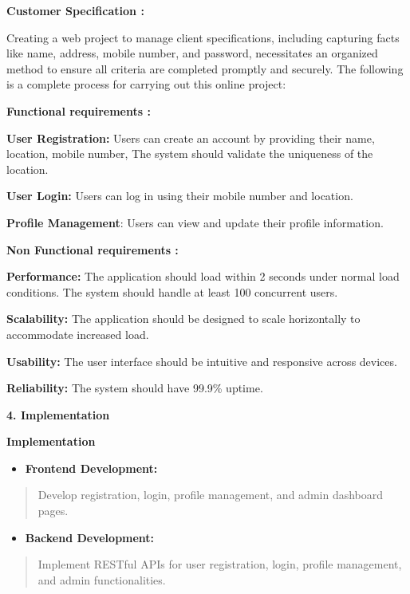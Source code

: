 \documentclass[
]{article}
\begin{document}
\textbf{Customer Specification :}

Creating a web project to manage client specifications, including
capturing facts like name, address, mobile number, and password,
necessitates an organized method to ensure all criteria are completed
promptly and securely. The following is a complete process for carrying
out this online project:

\textbf{Functional requirements :}

\textbf{User Registration:} Users can create an account by providing
their name, location, mobile number, The system should validate the
uniqueness of the location.

\textbf{User Login:} Users can log in using their mobile number and
location.

\textbf{Profile Management}: Users can view and update their profile
information.

\textbf{Non Functional requirements :}

\textbf{Performance:} The application should load within 2 seconds under
normal load conditions. The system should handle at least 100 concurrent
users.

\textbf{Scalability:} The application should be designed to scale
horizontally to accommodate increased load.

\textbf{Usability:} The user interface should be intuitive and
responsive across devices.

\textbf{Reliability:} The system should have 99.9\% uptime.

\textbf{4. Implementation}

\textbf{Implementation}

\begin{itemize}
\item
  \textbf{Frontend Development:}
\end{itemize}

\begin{quote}
Develop registration, login, profile management, and admin dashboard
pages.
\end{quote}

\begin{itemize}
\item
  \textbf{Backend Development:}
\end{itemize}

\begin{quote}
Implement RESTful APIs for user registration, login, profile management,
and admin functionalities.
\end{quote}
\end{document}
